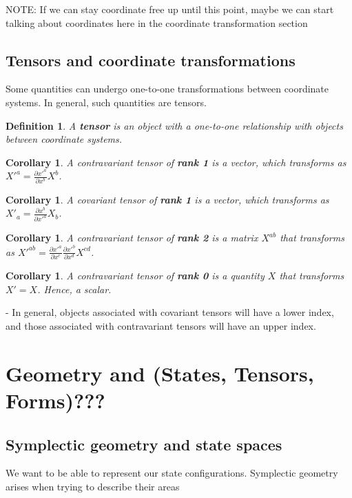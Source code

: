 \documentclass{book}
\newtheorem{defn}[equation]{Definition}
\newtheorem{coro}[equation]{Corollary}
\begin{document}
NOTE: If we can stay coordinate free up until this point, maybe we can start talking about coordinates here in the coordinate transformation section
\section{Tensors and coordinate transformations}
Some quantities can undergo one-to-one transformations between coordinate systems. In general, such quantities are tensors. 


\begin{defn}
	A \textbf{tensor} is an object with a one-to-one relationship with objects between coordinate systems. 
\end{defn}

\begin{coro}
	A contravariant tensor of \textbf{rank 1} is a vector, which transforms as  $X'^a = \frac{\partial x'^a}{\partial x^b} X^b$.  
\end{coro}

\begin{coro}
	A covariant tensor of \textbf{rank 1} is a vector, which transforms as $X'_a = \frac{\partial x^b}{\partial x'^a} X_b$. 
\end{coro}

\begin{coro}
	A contravariant tensor of \textbf{rank 2} is a matrix $X^{ab}$ that transforms as $X'^{ab} = \frac{\partial x'^a}{\partial x^c} \frac{\partial x'^b}{\partial x^d} X^{cd}$. 
\end{coro}

\begin{coro}
	A contravariant tensor of \textbf{rank 0} is a quantity $X$ that transforms $X' = X$. Hence, a scalar. 
\end{coro}

- In general, objects associated with covariant tensors will have a lower index, and those associated with contravariant tensors will have an upper index. 












\chapter{Geometry and (States, Tensors, Forms)???}


\section{Symplectic geometry and state spaces}
We want to be able to represent our state configurations. Symplectic geometry arises when trying to describe their areas
\end{document}
